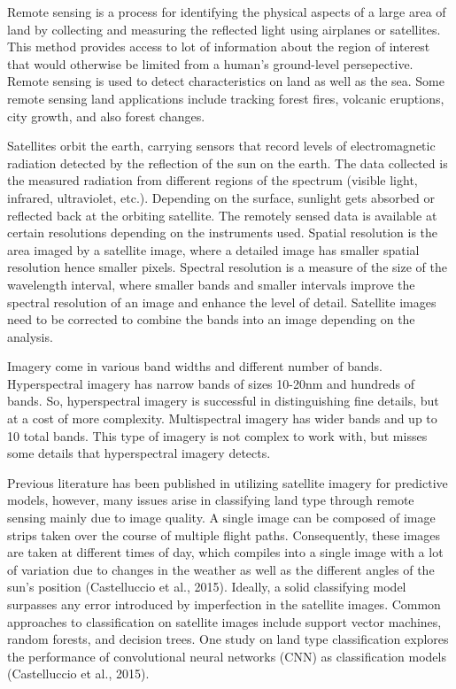 \documentclass[12pt,twoside]{reedthesis}
\begin{document}
Remote sensing is a process for identifying the physical aspects of a large area of land by collecting and measuring the reflected light using airplanes or satellites. This method provides access to lot of information about the region of interest that would otherwise be limited from a human's ground-level persepective. Remote sensing is used to detect characteristics on land as well as the sea. Some remote sensing land applications include tracking forest fires, volcanic eruptions, city growth, and also forest changes.

Satellites orbit the earth, carrying sensors that record levels of electromagnetic radiation detected by the reflection of the sun on the earth. The data collected is the measured radiation from different regions of the spectrum (visible light, infrared, ultraviolet, etc.). Depending on the surface, sunlight gets absorbed or reflected back at the orbiting satellite. The remotely sensed data is available at certain resolutions depending on the instruments used. Spatial resolution is the area imaged by a satellite image, where a detailed image has smaller spatial resolution hence smaller pixels. Spectral resolution is a measure of the size of the wavelength interval, where smaller bands and smaller intervals improve the spectral resolution of an image and enhance the level of detail. Satellite images need to be corrected to combine the bands into an image depending on the analysis.

Imagery come in various band widths and different number of bands. Hyperspectral imagery has narrow bands of sizes 10-20nm and hundreds of bands. So, hyperspectral imagery is successful in distinguishing fine details, but at a cost of more complexity. Multispectral imagery has wider bands and up to 10 total bands. This type of imagery is not complex to work with, but misses some details that hyperspectral imagery detects.

Previous literature has been published in utilizing satellite imagery for predictive models, however, many issues arise in classifying land type through remote sensing mainly due to image quality. A single image can be composed of image strips taken over the course of multiple flight paths. Consequently, these images are taken at different times of day, which compiles into a single image with a lot of variation due to changes in the weather as well as the different angles of the sun's position (Castelluccio et al., 2015). Ideally, a solid classifying model surpasses any error introduced by imperfection in the satellite images. Common approaches to classification on satellite images include support vector machines, random forests, and decision trees. One study on land type classification explores the performance of convolutional neural networks (CNN) as classification models (Castelluccio et al., 2015).
\end{document}
